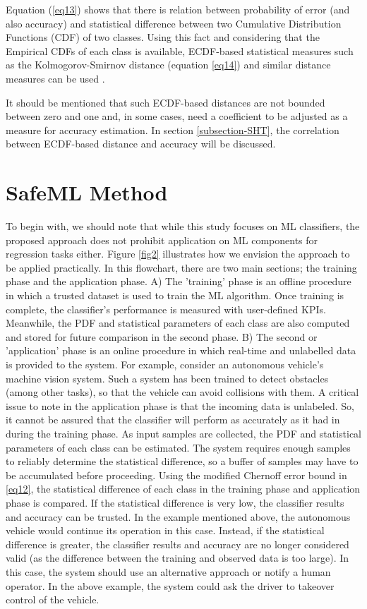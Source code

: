 \documentclass{article}
\begin{document}
Equation (\ref{eq13}) shows that there is relation between probability of error (and also accuracy) and statistical difference between two Cumulative Distribution Functions (CDF) of two classes. Using this fact and considering that the Empirical CDFs of each class is available, ECDF-based statistical measures such as  the Kolmogorov-Smirnov distance (equation \ref{eq14}) and similar distance measures can be used \cite{deza2014distances,raschke2011empirical}.



It should be mentioned that such ECDF-based distances are not bounded between zero and one and, in some cases, need a coefficient to be adjusted as a measure for accuracy estimation. In section \ref{subsection-SHT}, the correlation between ECDF-based distance and accuracy will be discussed.

\section{SafeML Method} \label{section-method}
To begin with, we should note that while this study focuses on ML classifiers, the proposed approach does not prohibit application on ML components for regression tasks either. Figure \ref{fig2} illustrates how we envision the approach to be applied practically. In this flowchart, there are two main sections; the training phase and the application phase. 
A) The 'training' phase is an offline procedure in which a trusted dataset is used to train the ML algorithm.  Once training is complete, the classifier's performance is measured with user-defined KPIs. Meanwhile, the PDF and statistical parameters of each class are also computed and stored for future comparison in the second phase. 
B) The second or 'application' phase is an online procedure in which real-time and unlabelled data is provided to the system. For example, consider an autonomous vehicle's machine vision system. Such a system has been trained to detect obstacles (among other tasks), so that the vehicle can avoid collisions with them. A critical issue to note in the application phase is that the incoming data is unlabeled. So, it cannot be assured that the classifier will perform as accurately as it had in during the training phase. As input samples are collected, the PDF and statistical parameters of each class can be estimated. The system requires enough samples to reliably determine the statistical difference, so a buffer of samples may have to be accumulated before proceeding. Using the modified Chernoff error bound in \ref{eq12},  the statistical difference of each class in the training phase and application phase is compared. If the statistical difference is very low, the classifier results and accuracy can be trusted. In the example mentioned above, the autonomous vehicle would continue its operation in this case.  Instead, if the  statistical difference is greater, the classifier results and accuracy are no longer considered valid (as the difference between the training and observed data is too large). In this case, the system should use an alternative approach or notify a human operator. In the above example, the system could ask the driver to takeover control of the vehicle.
\end{document}
